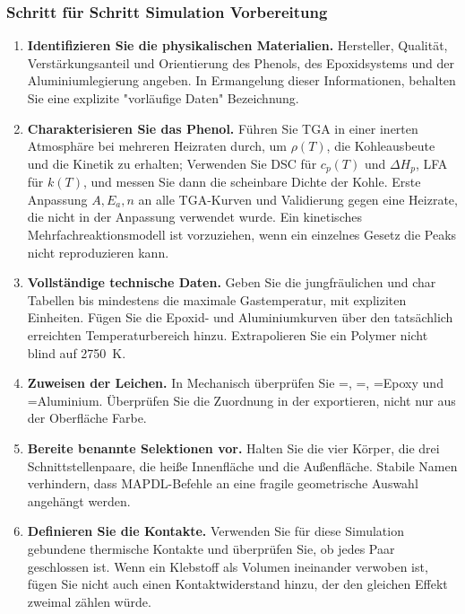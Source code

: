 \documentclass[oneside,openany]{amsdtx}
\begin{document}
\subsubsection{Schritt für Schritt Simulation Vorbereitung}

\begin{enumerate}[leftmargin=2.2em,label=\textbf{\arabic*.}]
\item \textbf{ Identifizieren Sie die physikalischen Materialien.} Hersteller, Qualität, Verstärkungsanteil und Orientierung des Phenols, des Epoxidsystems und der Aluminiumlegierung angeben. In Ermangelung dieser Informationen, behalten Sie eine explizite "vorläufige Daten" Bezeichnung.

\item \textbf{Charakterisieren Sie das Phenol.} Führen Sie TGA in einer inerten Atmosphäre bei mehreren Heizraten durch, um \(\rho(T)\), die Kohleausbeute und die Kinetik zu erhalten; Verwenden Sie DSC für \(c_p(T)\) und \(\Delta H_p\), LFA für \(k(T)\), und messen Sie dann die scheinbare Dichte der Kohle. Erste Anpassung \(A,E_a,n\) an alle TGA-Kurven und Validierung gegen eine Heizrate, die nicht in der Anpassung verwendet wurde. Ein kinetisches Mehrfachreaktionsmodell ist vorzuziehen, wenn ein einzelnes Gesetz die Peaks nicht reproduzieren kann.

\item \textbf{Vollständige technische Daten.} Geben Sie die jungfräulichen und char Tabellen bis mindestens die maximale Gastemperatur, mit expliziten Einheiten. Fügen Sie die Epoxid- und Aluminiumkurven über den tatsächlich erreichten Temperaturbereich hinzu. Extrapolieren Sie ein Polymer nicht blind auf \SI{2750}{K}.

\item \textbf{Zuweisen der Leichen.} In Mechanisch überprüfen Sie =, =, =Epoxy und =Aluminium. Überprüfen Sie die Zuordnung in der  exportieren, nicht nur aus der Oberfläche Farbe.

\item \textbf{Bereite benannte Selektionen vor.} Halten Sie die vier Körper, die drei Schnittstellenpaare, die heiße Innenfläche und die Außenfläche. Stabile Namen verhindern, dass MAPDL-Befehle an eine fragile geometrische Auswahl angehängt werden.

\item \textbf{Definieren Sie die Kontakte.} Verwenden Sie für diese Simulation gebundene thermische Kontakte und überprüfen Sie, ob jedes Paar geschlossen ist. Wenn ein Klebstoff als Volumen ineinander verwoben ist, fügen Sie nicht auch einen Kontaktwiderstand hinzu, der den gleichen Effekt zweimal zählen würde.


\end{enumerate}
\end{document}
